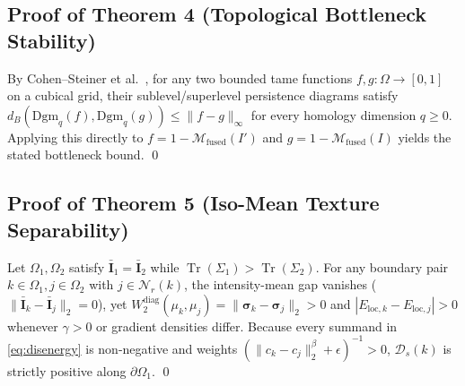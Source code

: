 \subsection{Proof of Theorem 4 (Topological Bottleneck Stability)}
By Cohen--Steiner et al.\ \cite{cohen2007stability}, for any two bounded tame functions $f, g : \Omega \to [0,1]$ on a cubical grid, their sublevel/superlevel persistence diagrams satisfy $d_B(\mathrm{Dgm}_q(f), \mathrm{Dgm}_q(g)) \le \lVert f - g \rVert_\infty$ for every homology dimension $q \ge 0$. Applying this directly to $f = 1 - \mathcal{M}_{\mathrm{fused}}(I')$ and $g = 1 - \mathcal{M}_{\mathrm{fused}}(I)$ yields the stated bottleneck bound. \qed

\subsection{Proof of Theorem 5 (Iso-Mean Texture Separability)}
Let $\Omega_1, \Omega_2$ satisfy $\bar{\mathbf{I}}_1 = \bar{\mathbf{I}}_2$ while $\operatorname{Tr}(\Sigma_1) > \operatorname{Tr}(\Sigma_2)$. For any boundary pair $k \in \Omega_1, j \in \Omega_2$ with $j \in \mathcal{N}_r(k)$, the intensity-mean gap vanishes ($\lVert \bar{\mathbf{I}}_k - \bar{\mathbf{I}}_j\rVert_2 = 0$), yet $W_2^{\mathrm{diag}}(\mu_k, \mu_j) = \lVert \boldsymbol{\sigma}_k - \boldsymbol{\sigma}_j \rVert_2 > 0$ and $|E_{\mathrm{loc},k} - E_{\mathrm{loc},j}| > 0$ whenever $\gamma > 0$ or gradient densities differ. Because every summand in \eqref{eq:disenergy} is non-negative and weights $(\lVert c_k - c_j\rVert_2^\beta + \epsilon)^{-1} > 0$, $\mathcal{D}_s(k)$ is strictly positive along $\partial \Omega_1$. \qed
